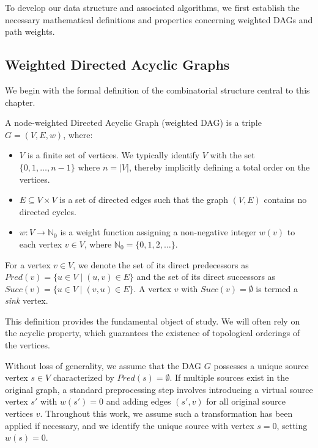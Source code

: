 To develop our data structure and associated algorithms, we first establish the necessary mathematical definitions and properties concerning weighted DAGs and path weights.

\subsection*{Weighted Directed Acyclic Graphs}
\label{subsec:dag_def}

We begin with the formal definition of the combinatorial structure central to this chapter.

\begin{definition}
    \label{def:weighted_dag}
    A node-weighted Directed Acyclic Graph (weighted DAG) is a triple $G = (V, E, w)$, where:
    \begin{itemize}
        \item $V$ is a finite set of vertices. We typically identify $V$ with the set $\{0, 1, \dots, n-1\}$ where $n = |V|$, thereby implicitly defining a total order on the vertices.
        \item $E \subseteq V \times V$ is a set of directed edges such that the graph $(V, E)$ contains no directed cycles.
        \item $w: V \to \mathbb{N}_0$ is a weight function assigning a non-negative integer $w(v)$ to each vertex $v \in V$, where $\mathbb{N}_0 = \{0, 1, 2, \dots\}$.
    \end{itemize}
    For a vertex $v \in V$, we denote the set of its direct predecessors as $Pred(v) = \{u \in V \mid (u, v) \in E\}$ and the set of its direct successors as $Succ(v) = \{u \in V \mid (v, u) \in E\}$. A vertex $v$ with $Succ(v) = \emptyset$ is termed a \emph{sink} vertex.
\end{definition}

This definition provides the fundamental object of study. We will often rely on the acyclic property, which guarantees the existence of topological orderings of the vertices.

\begin{assumption}
    \label{ass:unique_source}
    Without loss of generality, we assume that the DAG $G$ possesses a unique source vertex $s \in V$ characterized by $Pred(s) = \emptyset$. If multiple sources exist in the original graph, a standard preprocessing step involves introducing a virtual source vertex $s'$ with $w(s')=0$ and adding edges $(s', v)$ for all original source vertices $v$. Throughout this work, we assume such a transformation has been applied if necessary, and we identify the unique source with vertex $s=0$, setting $w(s)=0$.
\end{assumption}

